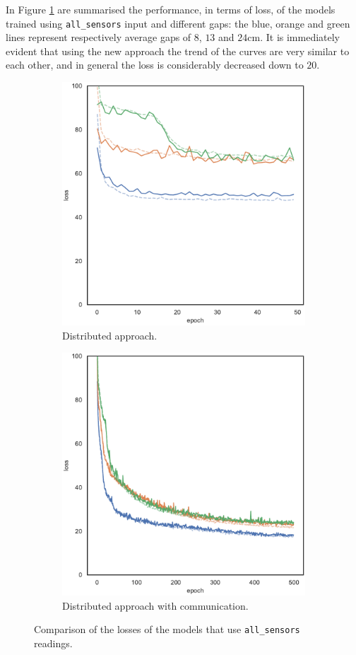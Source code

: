 In Figure \ref{fig:commlossall_sensors} are summarised the performance, 
in terms of loss, of the models trained using \texttt{all\_sensors} input and 
different gaps: the blue, orange and green lines represent respectively average 
gaps of $8$, $13$ and $24$\gls{cm}.
It is immediately evident that using the new approach the trend of the curves are 
very similar to each other, and in general the loss is considerably decreased down 
to $20$.
\begin{figure}[!htb]
	\begin{center}
			\begin{subfigure}[h]{0.49\textwidth}
			\centering
			\includegraphics[width=.7\textwidth]{contents/images/task1-comm/loss-distributed-all_sensors@copy}
			\caption{Distributed approach.}
		\end{subfigure}
		\hfill
		\begin{subfigure}[h]{0.49\textwidth}
			\centering
			\includegraphics[width=.7\textwidth]{contents/images/task1-comm/loss-communication-all_sensors@copy}
			\caption{Distributed approach with communication.}
		\end{subfigure}	
	\end{center}
	\vspace{-0.5cm}
	\caption{Comparison of the losses of the models that use \texttt{all\_sensors} 
		readings.}
	\label{fig:commlossall_sensors}
\end{figure}

